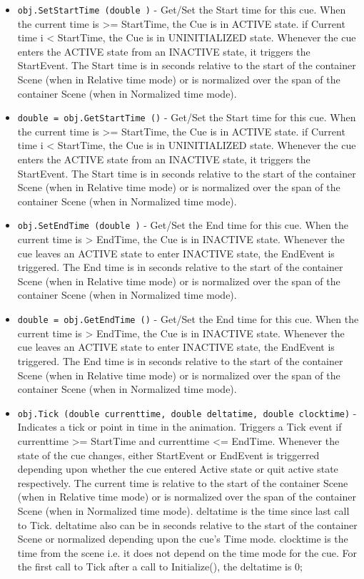 \begin{itemize}
\item  \verb|obj.SetStartTime (double )| -  Get/Set the Start time for this cue.
 When the current time is >= StartTime, the Cue is in
 ACTIVE state. if Current time i < StartTime, the Cue is in
 UNINITIALIZED state. Whenever the cue enters the ACTIVE state from
 an INACTIVE state, it triggers the StartEvent.
 The Start time is in seconds relative to the start of the 
 container Scene (when in Relative time mode) or is normalized
 over the span of the container Scene (when in Normalized time mode).

\item  \verb|double = obj.GetStartTime ()| -  Get/Set the Start time for this cue.
 When the current time is >= StartTime, the Cue is in
 ACTIVE state. if Current time i < StartTime, the Cue is in
 UNINITIALIZED state. Whenever the cue enters the ACTIVE state from
 an INACTIVE state, it triggers the StartEvent.
 The Start time is in seconds relative to the start of the 
 container Scene (when in Relative time mode) or is normalized
 over the span of the container Scene (when in Normalized time mode).

\item  \verb|obj.SetEndTime (double )| -  Get/Set the End time for this cue.
 When the current time is > EndTime, the Cue is in
 INACTIVE state. Whenever the cue leaves an ACTIVE state to enter 
 INACTIVE state, the EndEvent is triggered.
 The End time is in seconds relative to the start of the 
 container Scene (when in Relative time mode) or is normalized
 over the span of the container Scene (when in Normalized time mode).

\item  \verb|double = obj.GetEndTime ()| -  Get/Set the End time for this cue.
 When the current time is > EndTime, the Cue is in
 INACTIVE state. Whenever the cue leaves an ACTIVE state to enter 
 INACTIVE state, the EndEvent is triggered.
 The End time is in seconds relative to the start of the 
 container Scene (when in Relative time mode) or is normalized
 over the span of the container Scene (when in Normalized time mode).

\item  \verb|obj.Tick (double currenttime, double deltatime, double clocktime)| -  Indicates a tick or point in time in the animation.
 Triggers a Tick event if currenttime >= StartTime and
 currenttime <= EndTime.
 Whenever the state of the cue changes,
 either StartEvent or EndEvent is triggerred depending upon 
 whether the cue entered Active state or quit active state respectively.
 The current time is relative to the start of the container Scene 
 (when in Relative time mode) or is normalized
 over the span of the container Scene (when in Normalized time mode).
 deltatime is the time since last call to Tick. deltatime also can be in seconds
 relative to the start of the container Scene or normalized depending upon the
 cue's Time mode.
 clocktime is the time from the scene i.e. it does not depend on the time
 mode for the cue.
 For the first call to Tick
 after a call to Initialize(), the deltatime is 0;


\end{itemize}
